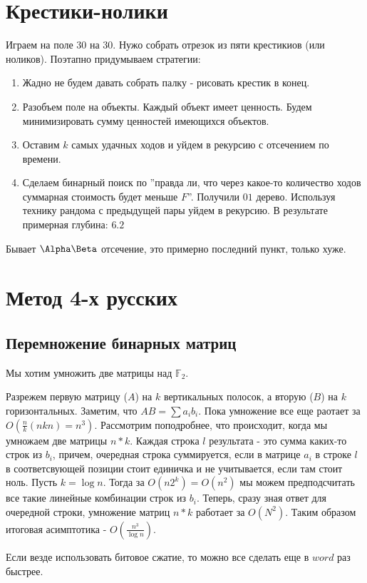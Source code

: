 \section{Крестики-нолики}
Играем на поле 30 на 30. Нужо собрать отрезок из пяти крестикиов (или ноликов). 
Поэтапно придумываем стратегии:
\begin{enumerate}
  \item Жадно не будем давать собрать палку - рисовать крестик в конец.
  \item Разобъем поле на объекты. Каждый объект имеет ценность. Будем минимизировать сумму ценностей имеющихся объектов.
  \item Оставим $k$ самых удачных ходов и уйдем в рекурсию с отсечением по времени.
  \item Сделаем бинарный поиск по ''правда ли, что через какое-то количество ходов суммарная стоимость будет меньше $F$''. Получили $01$ дерево. 
    Используя технику рандома с предыдущей пары уйдем в рекурсию. В результате примерная глубина: $6.2$
\end{enumerate}
Бывает $\Alpha\Beta$ отсечение, это примерно последний пункт, только хуже.

\section{Метод 4-х русских}
\subsection{Перемножение бинарных матриц}
\par Мы хотим умножить две матрицы над $\mathbb{F}_2$.
\par Разрежем первую матрицу ($A$) на $k$ вертикальных полосок, а вторую ($B$) на $k$ горизонтальных. Заметим, что $AB = \sum{a_ib_i}$. 
  Пока умножение все еще раотает за $O(\frac{n}{k}(nkn) = n^3)$. Рассмотрим поподробнее, что происходит, когда мы умножаем две матрицы $n*k$. 
  Каждая строка $l$ результата - это сумма каких-то строк из $b_i$, причем, очередная строка суммируется, если в матрице $a_i$ в строке $l$ в соответсвующей позиции стоит
  единичка и не учитывается, если там стоит ноль. Пусть $k = \log{n}$. Тогда за $O(n2^k) = O(n^2)$ мы можем предподсчитать все такие линейные комбинации строк из $b_i$. 
  Теперь, сразу зная ответ для очередной строки, умножение матриц $n*k$ работает за $O(N^2)$. Таким образом итоговая асимптотика - $O(\frac{n^3}{\log{n}})$. 
\par Если везде использовать битовое сжатие, то можно все сделать еще в $word$ раз быстрее.
